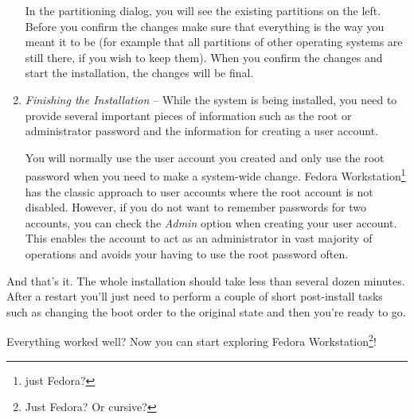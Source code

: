 \begin{enumerate}
In the partitioning dialog, you will see the existing partitions on the left. Before you confirm the changes make sure that everything is the way you meant it to be (for example that all partitions of other operating systems are still there, if you wish to keep them). When you confirm the changes and start the installation, the changes will be final.

\item\emph{Finishing the Installation} -- While the system is being installed, you need to provide several important pieces of information such as the root or administrator password and the information for creating a user account.

You will normally use the user account you created and only use the root password when you need to make a system-wide change. Fedora Workstation\footnote{just Fedora?} has the classic approach to user accounts where the root account is not disabled. However, if you do not want to remember passwords for two accounts, you can check the \emph{Admin} option when creating your user account. This enables the account to act as an administrator in vast majority of operations and avoids your having to use the root password often.
\end{enumerate}

And that's it. The whole installation should take less than several dozen minutes. After a restart you'll just need to perform a couple of short post-install tasks such as changing the boot order to the original state and then you're ready to go.

Everything worked well? Now you can start exploring Fedora Workstation\footnote{Just Fedora? Or cursive?}!

\endinput

